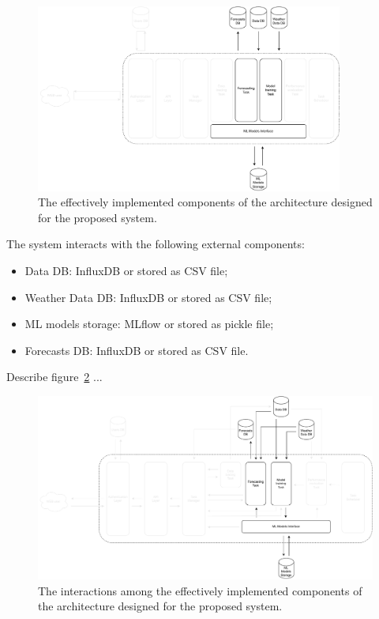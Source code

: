 \begin{figure}[H]
\centering
\includegraphics[width=0.9\textwidth]{images/implementation_components}
\caption{The effectively implemented components of the architecture designed for the proposed system.}
\label{fig:implementationcomponents}
\end{figure}

The system interacts with the following external components:
\begin{itemize}
  \item Data DB: InfluxDB or stored as CSV file;
  \item Weather Data DB: InfluxDB or stored as CSV file;
  \item ML models storage: MLflow or stored as pickle file;
  \item Forecasts DB: InfluxDB or stored as CSV file.
\end{itemize}

Describe figure~\ref{fig:implementationinteractions} ...

\begin{figure}[H]
\centering
\includegraphics[width=1\textwidth]{images/implementation_interactions}
\caption{The interactions among the effectively implemented components of the architecture designed for the proposed system.}
\label{fig:implementationinteractions}
\end{figure}


